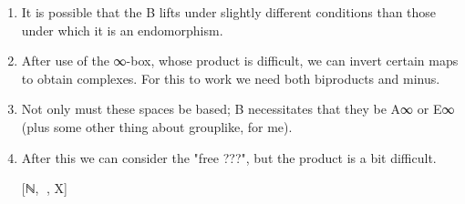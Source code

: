 \documentclass{book}
\theoremstyle{definition}
\begin{document}

\begin{enumerate}
\item It is possible that the B lifts under slightly different conditions than those under which it is an endomorphism.
\item After use of the ∞-box, whose product is difficult, we can invert certain maps to obtain complexes. For this to work we need both biproducts and minus.
\item Not only must these spaces be based; B necessitates that they be A∞ or E∞ (plus some other thing about grouplike, for me).
\item After this we can consider the "free ???", but the product is a bit difficult.
\item [[ℕ,γ⃗], X]
\end{enumerate}
\end{document}
